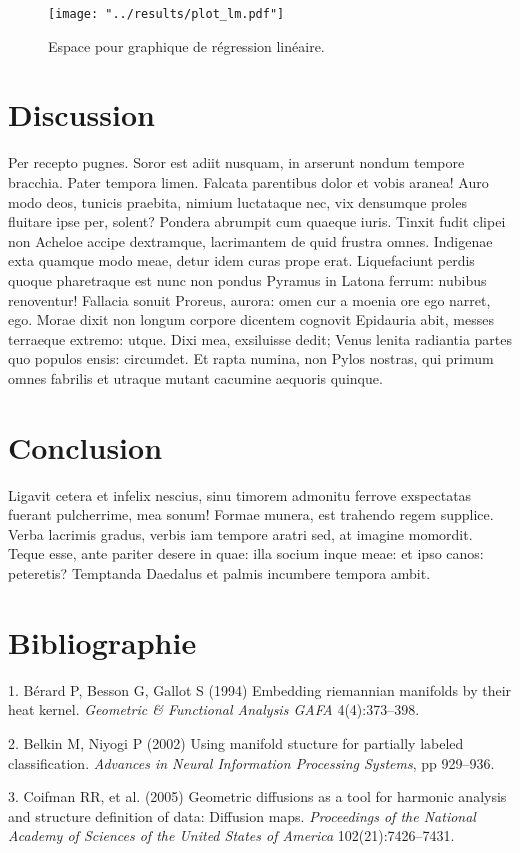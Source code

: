 \documentclass[
]{article}
\begin{document}
\begin{figure}
\centering
\texttt{[image: "../results/plot\_lm.pdf"]}
\caption{Espace pour graphique de régression linéaire.
\label{fig:plot1}}
\end{figure}

\hypertarget{discussion}{%
\section{Discussion}\label{discussion}}

Per recepto pugnes. Soror est adiit nusquam, in arserunt nondum tempore
bracchia. Pater tempora limen. Falcata parentibus dolor et vobis aranea!
Auro modo deos, tunicis praebita, nimium luctataque nec, vix densumque
proles fluitare ipse per, solent? Pondera abrumpit cum quaeque iuris.
Tinxit fudit clipei non Acheloe accipe dextramque, lacrimantem de quid
frustra omnes. Indigenae exta quamque modo meae, detur idem curas prope
erat. Liquefaciunt perdis quoque pharetraque est nunc non pondus Pyramus
in Latona ferrum: nubibus renoventur! Fallacia sonuit Proreus, aurora:
omen cur a moenia ore ego narret, ego. Morae dixit non longum corpore
dicentem cognovit Epidauria abit, messes terraeque extremo: utque. Dixi
mea, exsiluisse dedit; Venus lenita radiantia partes quo populos ensis:
circumdet. Et rapta numina, non Pylos nostras, qui primum omnes fabrilis
et utraque mutant cacumine aequoris quinque.

\hypertarget{conclusion}{%
\section{Conclusion}\label{conclusion}}

Ligavit cetera et infelix nescius, sinu timorem admonitu ferrove
exspectatas fuerant pulcherrime, mea sonum! Formae munera, est trahendo
regem supplice. Verba lacrimis gradus, verbis iam tempore aratri sed, at
imagine momordit. Teque esse, ante pariter desere in quae: illa socium
inque meae: et ipso canos: peteretis? Temptanda Daedalus et palmis
incumbere tempora ambit.

\newpage

\hypertarget{bibliographie}{%
\section*{Bibliographie}\label{bibliographie}}

\hypertarget{refs}{}
\leavevmode\hypertarget{ref-berard1994embedding}{}%
1. Bérard P, Besson G, Gallot S (1994) Embedding riemannian manifolds by
their heat kernel. \emph{Geometric \& Functional Analysis GAFA}
4(4):373--398.

\leavevmode\hypertarget{ref-belkin2002using}{}%
2. Belkin M, Niyogi P (2002) Using manifold stucture for partially
labeled classification. \emph{Advances in Neural Information Processing
Systems}, pp 929--936.

\leavevmode\hypertarget{ref-coifman2005geometric}{}%
3. Coifman RR, et al. (2005) Geometric diffusions as a tool for harmonic
analysis and structure definition of data: Diffusion maps.
\emph{Proceedings of the National Academy of Sciences of the United
States of America} 102(21):7426--7431.
\end{document}
